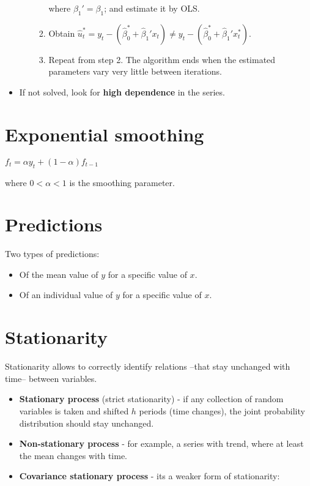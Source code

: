 \documentclass[10pt, a4paper, landscape]{article}
\begin{document}
\begin{multicols}{3}
\begin{itemize}[leftmargin=*]
\begin{itemize}[leftmargin=*]
\begin{enumerate}[leftmargin=*]
					where $\beta_{1}' = \beta_{1}$; and estimate it by OLS.
					
					\item Obtain $\hat{u}_{t}^{*} = y_{t} - (\hat{\beta}_{0}^{*} + \hat{\beta}_{1}' x_{t}) \neq y_{t} - (\hat{\beta}_{0}^{*} + \hat{\beta}_{1}' x_{t}^{*})$.
					\item Repeat from step 2. The algorithm ends when the estimated parameters vary very little between iterations.
				\end{enumerate}
			\end{itemize}
			
			\item If not solved, look for \textbf{high dependence} in the series.
		\end{itemize}
		
		\section*{Exponential smoothing}
		
		\begin{center}
			$f_{t} = \alpha y_{t} + (1 - \alpha) f_{t - 1}$
		\end{center}
		
		where $0 < \alpha < 1$ is the smoothing parameter.
		
		\section*{Predictions}
		
		Two types of predictions:
		
		\begin{itemize}[leftmargin=*]
			\item Of the mean value of $y$ for a specific value of $x$.
			\item Of an individual value of $y$ for a specific value of $x$.
		\end{itemize}
		
		\columnbreak
		
		\section*{Stationarity}
		
		Stationarity allows to correctly identify relations --that stay unchanged with time-- between variables.
		
		\begin{itemize}[leftmargin=*]
			\item \textbf{Stationary process} (strict stationarity) - if any collection of random variables is taken and shifted $h$ periods (time changes), the joint probability distribution should stay unchanged.
			\item \textbf{Non-stationary process} - for example, a series with trend, where at least the mean changes with time.
			\item \textbf{Covariance stationary process} - its a weaker form of stationarity:
			

\end{itemize}
\end{multicols}
\end{document}
